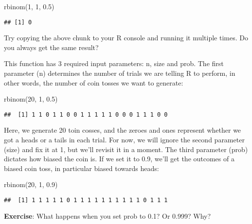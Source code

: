 \documentclass[
]{book}
\newenvironment{Shaded}{\begin{snugshade}}{\end{snugshade}}
\newcommand{\DecValTok}[1]{\textcolor[rgb]{0.00,0.00,0.81}{#1}}
\newcommand{\FloatTok}[1]{\textcolor[rgb]{0.00,0.00,0.81}{#1}}
\newcommand{\FunctionTok}[1]{\textcolor[rgb]{0.00,0.00,0.00}{#1}}
\newcommand{\NormalTok}[1]{#1}
\begin{document}
\begin{Shaded}
\begin{Highlighting}[]
\FunctionTok{rbinom}\NormalTok{(}\DecValTok{1}\NormalTok{, }\DecValTok{1}\NormalTok{, }\FloatTok{0.5}\NormalTok{)}
\end{Highlighting}
\end{Shaded}

\begin{verbatim}
## [1] 0
\end{verbatim}

Try copying the above chunk to your R console and running it multiple times. Do you always get the same result?

This function has 3 required input parameters: n, size and prob. The first parameter (n) determines the number of trials we are telling R to perform, in other words, the number of coin tosses we want to generate:

\begin{Shaded}
\begin{Highlighting}[]
\FunctionTok{rbinom}\NormalTok{(}\DecValTok{20}\NormalTok{, }\DecValTok{1}\NormalTok{, }\FloatTok{0.5}\NormalTok{)}
\end{Highlighting}
\end{Shaded}

\begin{verbatim}
##  [1] 1 1 0 1 1 0 0 1 1 1 1 1 0 0 0 1 1 1 0 0
\end{verbatim}

Here, we generate 20 toin cosses, and the zeroes and ones represent whether we got a heads or a tails in each trial. For now, we will ignore the second parameter (size) and fix it at 1, but we'll revisit it in a moment. The third parameter (prob) dictates how biased the coin is. If we set it to 0.9, we'll get the outcomes of a biased coin toss, in particular biased towards heads:

\begin{Shaded}
\begin{Highlighting}[]
\FunctionTok{rbinom}\NormalTok{(}\DecValTok{20}\NormalTok{, }\DecValTok{1}\NormalTok{, }\FloatTok{0.9}\NormalTok{)}
\end{Highlighting}
\end{Shaded}

\begin{verbatim}
##  [1] 1 1 1 1 1 0 1 1 1 1 1 1 1 1 1 1 0 1 1 1
\end{verbatim}

\textbf{Exercise}: What happens when you set prob to 0.1? Or 0.999? Why?
\end{document}
